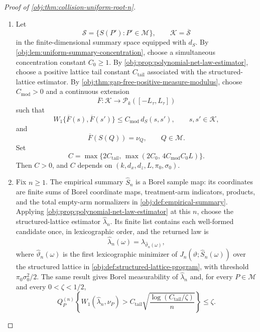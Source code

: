 \documentclass[11pt]{article}
\begin{document}
\begin{proof}[Proof of \cref{obj:thm:collision-uniform-root-n}]
\begin{enumerate}
\item Let
\[
\mathscr S=\{S(P'):P'\in\mathcal M\},
\qquad
\mathcal K=\overline{\mathscr S}
\]
in the finite-dimensional summary space equipped with \(d_S\).  By
\cref{obj:lem:uniform-summary-concentration}, choose a simultaneous
concentration constant \(C_0\ge 1\).  By
\cref{obj:prop:polynomial-net-law-estimator}, choose a positive lattice
tail constant \(C_{\mathrm{tail}}\) associated with the structured-lattice
estimator.  By \cref{obj:thm:gap-free-positive-measure-modulus}, choose
\(C_{\mathrm{mod}}>0\) and a continuous extension
\[
\overline F:\mathcal K\to \mathcal P_k([-L_\tau,L_\tau])
\]
such that
\[
W_1\{\overline F(s),\overline F(s')\}
\le
C_{\mathrm{mod}}\,d_S(s,s'),
\qquad s,s'\in\mathcal K,
\]
and
\[
\overline F(S(Q))=\nu_Q,
\qquad Q\in\mathcal M .
\]
Set
\[
C=
\max\{2C_{\mathrm{tail}},\,
      \max(2C_0,\,4C_{\mathrm{mod}}C_0L)\}.
\]
Then \(C>0\), and \(C\) depends on
\((k,d_x,d_z,L,\pi_0,\sigma_0)\).%

\item Fix \(n\ge1\).  The empirical summary \(\widehat S_n\) is a Borel
sample map: its coordinates are finite sums of Borel coordinate maps,
treatment-arm indicators, products, and the total empty-arm normalizers in
\cref{obj:def:empirical-summary}.  Applying
\cref{obj:prop:polynomial-net-law-estimator} at this \(n\), choose the
structured-lattice estimator \(\widehat\lambda_n\).  Its finite list contains
each well-formed candidate once, in lexicographic order, and the returned law is
\[
\widehat\lambda_n(\omega)=\lambda_{\widehat\vartheta_n(\omega)},
\]
where \(\widehat\vartheta_n(\omega)\) is the first lexicographic minimizer of
\(J_n(\vartheta;\widehat S_n(\omega))\) over the structured lattice in
\cref{obj:def:structured-lattice-program}, with threshold
\(\pi_0\sigma_0^2/2\).  The same result gives Borel measurability of
\(\widehat\lambda_n\) and, for every \(P\in\mathcal M\) and every
\(0<\zeta<1/2\),
\[
Q_P^{(n)}
\left\{
W_1(\widehat\lambda_n,\nu_P)>
C_{\mathrm{tail}}
\sqrt{\frac{\log(C_{\mathrm{tail}}/\zeta)}{n}}
\right\}
\le \zeta .
\]%


\end{enumerate}
\end{proof}
\end{document}
